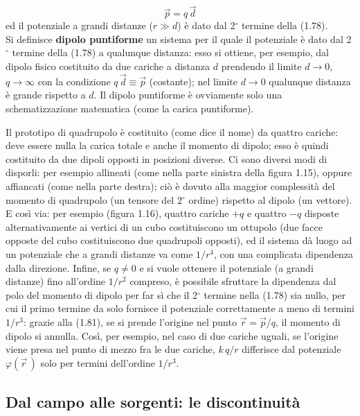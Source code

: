 \begin{equation}
  \vec p=q\,\vec d
  \tag{1.82}
\end{equation}
ed il potenziale a grandi distanze ($r\gg d$) \`e dato dal 2$^\circ$ termine
della (1.78).\\
Si definisce \textbf{dipolo puntiforme} un sistema per il quale il potenziale
\`e dato dal 2$^\circ$ termine della (1.78) a qualunque distanza: esso si
ottiene, per esempio, dal dipolo fisico costituito da due cariche a distanza $d$
prendendo il limite $d\to0$, $q\to\infty$ con la condizione
$q\,\vec d\equiv\vec p$ (costante); nel limite $d\to0$ qualunque distanza \`e
grande rispetto a $d$. Il dipolo puntiforme \`e ovviamente solo una
schematizzazione matematica (come la carica puntiforme).

Il prototipo di quadrupolo \`e costituito (come dice il nome) da quattro
cariche: deve essere nulla la carica totale e anche il momento di dipolo; esso
\`e quindi costituito da due dipoli opposti in posizioni diverse. Ci sono
diversi modi di disporli: per esempio allineati (come nella parte sinistra della
figura 1.15), oppure affiancati (come nella parte destra); ci\`o \`e dovuto alla
maggior complessit\`a del momento di quadrupolo (un tensore del 2$^\circ$
ordine) rispetto al dipolo (un vettore).
E cos\`i via: per esempio (figura 1.16), quattro cariche $+q$ e quattro $-q$
disposte alternativamente ai vertici di un cubo costituiscono un ottupolo (due
facce opposte del cubo costituiscono due quadrupoli opposti), ed il sistema d\`a
luogo ad un potenziale che a grandi distanze va come $1/r^4$, con una complicata
dipendenza dalla direzione.
Infine, se $q\neq0$ e si vuole ottenere il potenziale (a grandi distanze) fino
all'ordine $1/r^2$ compreso, \`e possibile sfruttare la dipendenza dal polo del
momento di dipolo per far s\`i che il 2$^\circ$ termine nella (1.78) sia nullo,
per cui il primo termine da solo fornisce il potenziale correttamente a meno di
termini $1/r^3$: grazie alla (1.81), se si prende l'origine nel punto
$\vec r=\vec p/q$, il momento di dipolo si annulla. Cos\`i, per esempio, nel
caso di due cariche uguali, se l'origine viene presa nel punto di mezzo fra le
due cariche, $k\,q/r$ differisce dal potenziale $\varphi(\vec r\,)$ solo per
termini dell'ordine $1/r^3$.

\subsection{Dal campo alle sorgenti: le discontinuit\`a}

